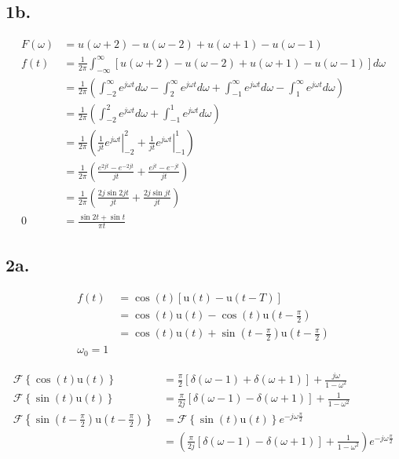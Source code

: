 \documentclass[letterpaper]{article}
\begin{document}
\subsection*{1b.}

\begin{align*}
    F(\omega) &= u(\omega+2) - u(\omega-2) + u(\omega+1) - u(\omega-1)\\
    f(t) &= \frac{1}{2\pi} \int_{-\infty}^{\infty} \left[ u(\omega+2) - u(\omega-2) + u(\omega+1) - u(\omega-1) \right] d\omega\\
    &= \frac{1}{2\pi}\left(\int_{-2}^{\infty}e^{j\omega t} d\omega - \int_{2}^{\infty}e^{j\omega t} d\omega + \int_{-1}^{\infty}e^{j\omega t} d\omega - \int_{1}^{\infty}e^{j\omega t} d\omega \right)\\
    & = \frac{1}{2\pi}\left(\int_{-2}^{2}e^{j\omega t} d\omega + \int_{-1}^{1}e^{j\omega t} d\omega \right)\\
    & = \frac{1}{2\pi}\left( \left.\frac{1}{jt} e^{j \omega t} \right\rvert_{-2}^{2} + \left.\frac{1}{jt} e^{j \omega t} \right\rvert_{-1}^{1} \right)\\
    &=\frac{1}{2\pi} \left( \frac{e^{2jt}-e^{-2jt}}{jt} + \frac{e^{jt}-e^{-jt}}{jt} \right)\\
    &=\frac{1}{2\pi} \left( \frac{2j\sin{2jt}}{jt} + \frac{2j\sin{jt}}{jt} \right)\\0
    &= \frac{\sin{2t}+\sin{t}}{\pi t}
\end{align*}
\newpage
\subsection*{2a.}

\begin{align*}
    f(t) &=\cos(t)\left[\mathrm{u}\left(t\right) - \mathrm{u}\left(t - T\right)\right]\\
    &= \cos(t) \mathrm{u}(t) - \cos(t)\mathrm{u}\left(t-\frac{\pi}{2}\right)\\
    &= \cos(t) \mathrm{u}(t) + \sin\left(t-\frac{\pi}{2}\right)\mathrm{u}\left(t-\frac{\pi}{2}\right)\\
    \omega_0 = 1
\end{align*}


\begin{align*}
    \mathcal{F}\left\{\cos(t)\mathrm{u}(t)\right\} &= \frac{\pi}{2} \left[\delta(\omega - 1)+\delta(\omega +1)\right] + \frac{j\omega}{1-\omega^2}\\
    \mathcal{F}\left\{\sin(t)\mathrm{u}(t)\right\} &= \frac{\pi}{2j} \left[\delta(\omega - 1)-\delta(\omega +1)\right] + \frac{1}{1-\omega^2}\\
    \mathcal{F}\left\{ \sin\left(t-\frac{\pi}{2}\right)\mathrm{u}\left(t-\frac{\pi}{2}\right) \right\} &= \mathcal{F}\left\{\sin(t)\mathrm{u}(t)\right\} e^{-j\omega \frac{\pi}{2}}\\
    &= \left( \frac{\pi}{2j} \left[\delta(\omega - 1)-\delta(\omega +1)\right] + \frac{1}{1-\omega^2} \right) e^{-j\omega \frac{\pi}{2}}
\end{align*}
\end{document}
